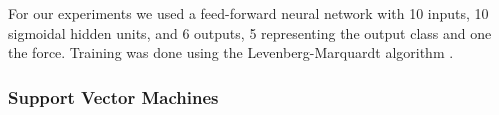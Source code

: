 %

For our experiments we used a feed-forward neural network with 10
inputs, 10 sigmoidal hidden units, and 6 outputs, 5 representing
the output class and one the force. Training was done using the
Levenberg-Marquardt algorithm \cite{lma}.
%

\subsubsection{Support Vector Machines}

